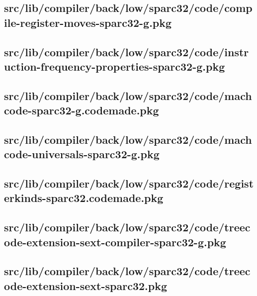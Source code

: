 \subsection{src/lib/compiler/back/low/sparc32/code/compile-register-moves-sparc32-g.pkg}


\subsection{src/lib/compiler/back/low/sparc32/code/instruction-frequency-properties-sparc32-g.pkg}


\subsection{src/lib/compiler/back/low/sparc32/code/machcode-sparc32-g.codemade.pkg}


\subsection{src/lib/compiler/back/low/sparc32/code/machcode-universals-sparc32-g.pkg}


\subsection{src/lib/compiler/back/low/sparc32/code/registerkinds-sparc32.codemade.pkg}


\subsection{src/lib/compiler/back/low/sparc32/code/treecode-extension-sext-compiler-sparc32-g.pkg}


\subsection{src/lib/compiler/back/low/sparc32/code/treecode-extension-sext-sparc32.pkg}


